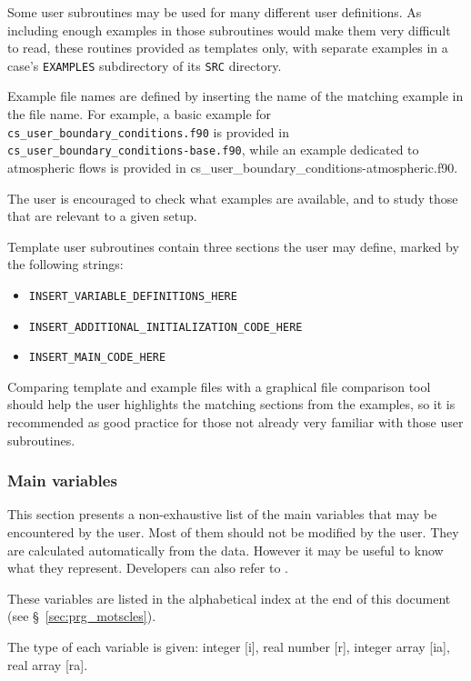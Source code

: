{{{{Some user subroutines may be used for many different user definitions. As
including enough examples in those subroutines would make them very
difficult to read, these routines provided as templates only, with
separate examples in a case's \texttt{EXAMPLES} subdirectory of its
\texttt{SRC} directory.

Example file names are defined by inserting the name of the matching example
in the file name. For example, a basic example for
\texttt{cs\_user\_boundary\_conditions.f90} is provided in \\
\texttt{cs\_user\_boundary\_conditions-base.f90}, while an example dedicated
to atmospheric flows is provided in
{cs\_user\_boundary\_conditions-atmospheric.f90}.

The user is encouraged to check what examples are available, and to study
those that are relevant to a given setup.

Template user subroutines contain three sections the user may define,
marked by the following strings:

\begin{itemize}
\item \texttt{INSERT\_VARIABLE\_DEFINITIONS\_HERE}
\item \texttt{INSERT\_ADDITIONAL\_INITIALIZATION\_CODE\_HERE}
\item \texttt{INSERT\_MAIN\_CODE\_HERE}
\end{itemize}

Comparing template and example files with a graphical file comparison tool
should help the user highlights the matching sections from the examples,
so it is recommended as good practice for those not already very familiar
with those user subroutines.

\subsubsection{Main variables}

This section presents a non-exhaustive list of the main variables that
may be encountered by the user. Most of them should not be modified by the
user. They are calculated automatically from the data. However it may be
useful to know what they represent.
Developers can also refer to \cite{theory}.

These variables are listed in the alphabetical index at the end of this
document (see \S~\ref{sec:prg_motscles}).

The type of each variable is given: integer [i], real number [r],
integer array [ia], real array [ra].

}}}}
